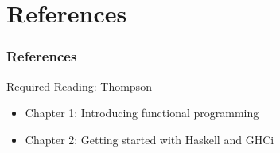 \documentclass[dvipsnames]{beamer}
\theoremstyle{plain}
\begin{document}
\section*{References}

\begin{frame}
  \frametitle{References}

  \begin{block}{Required Reading: Thompson}
    \begin{itemize}
      \item Chapter 1: \alert{Introducing functional programming}
      \item Chapter 2: \alert{Getting started with Haskell and GHCi}
    \end{itemize}
  \end{block}
\end{frame}
\end{document}

